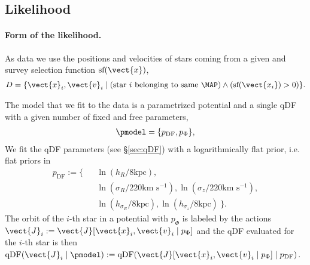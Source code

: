 \subsection{Likelihood} \label{sec:likelihood}

\paragraph{Form of the likelihood.}  As data we use the positions and velocities of stars coming from a given \MAP and survey selection function $\text{sf}(\vect{x})$,
\begin{eqnarray*}
D  =\{ \vect{x}_i,\vect{v}_i \mid \text{(star $i$ belonging to same \MAP)} \wedge (\text{sf}(\vect{x_i}) > 0) \}.
\end{eqnarray*}

The model that we fit to the data is a parametrized potential and a single qDF with a given number of fixed and free parameters,
\begin{eqnarray*}
\pmodel =\{ p_\text{DF} , p_\Phi \},
\end{eqnarray*}
We fit the qDF parameters (see \S\ref{sec:qDF}) with a logarithmically flat prior, i.e. flat priors in
\begin{eqnarray*}
p_\text{DF} := \{&& \ln \left(h_R/8\text{kpc}\right), \\
&& \ln \left(\sigma_R/220\text{km s$^{-1}$}\right), \ln \left(\sigma_z/220\text{km s$^{-1}$}\right), \\
&& \ln \left(h_{\sigma_R}/8\text{kpc}\right), \ln \left(h_{\sigma_z}/8\text{kpc}\right)\ \}.
\end{eqnarray*}
The orbit of the $i$-th star in a potential with $p_\Phi$ is labeled by the actions $\vect{J}_i := \vect{J}[\vect{x}_i,\vect{v}_i\mid p_{\Phi}]$ and the qDF evaluated for the $i$-th star is then $\text{qDF}(\vect{J}_i \mid \pmodel) := \text{qDF}(\vect{J}[\vect{x}_i,\vect{v}_i\mid p_{\Phi}] \mid p_\text{DF})$.

